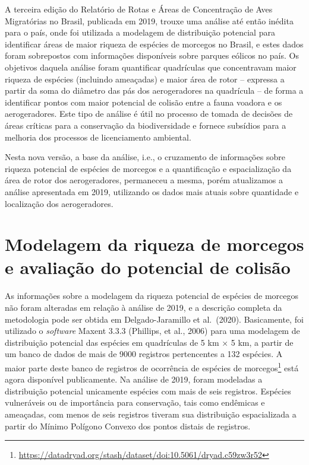 \documentclass[
  oneside]{scrbook}
\DeclareRobustCommand{\href}[2]{#2\footnote{\url{#1}}}
\begin{document}
A terceira edição do Relatório de Rotas e Áreas de Concentração de Aves Migratórias no Brasil, publicada em 2019, trouxe uma análise até então inédita para o país, onde foi utilizada a modelagem de distribuição potencial para identificar áreas de maior riqueza de espécies de morcegos no Brasil, e estes dados foram sobrepostos com informações disponíveis sobre parques eólicos no país. Os objetivos daquela análise foram quantificar quadrículas que concentravam maior riqueza de espécies (incluindo ameaçadas) e maior área de rotor -- expressa a partir da soma do diâmetro das pás dos aerogeradores na quadrícula -- de forma a identificar pontos com maior potencial de colisão entre a fauna voadora e os aerogeradores. Este tipo de análise é útil no processo de tomada de decisões de áreas críticas para a conservação da biodiversidade e fornece subsídios para a melhoria dos processos de licenciamento ambiental.

Nesta nova versão, a base da análise, i.e., o cruzamento de informações sobre riqueza potencial de espécies de morcegos e a quantificação e espacialização da área de rotor dos aerogeradores, permaneceu a mesma, porém atualizamos a análise apresentada em 2019, utilizando os dados mais atuais sobre quantidade e localização dos aerogeradores.

\hypertarget{modelagem-da-riqueza-de-morcegos-e-avaliauxe7uxe3o-do-potencial-de-colisuxe3o}{%
\section{Modelagem da riqueza de morcegos e avaliação do potencial de colisão}\label{modelagem-da-riqueza-de-morcegos-e-avaliauxe7uxe3o-do-potencial-de-colisuxe3o}}

As informações sobre a modelagem da riqueza potencial de espécies de morcegos não foram alteradas em relação à análise de 2019, e a descrição completa da metodologia pode ser obtida em Delgado-Jaramillo et al.~(2020). Basicamente, foi utilizado o \emph{software} Maxent 3.3.3 (Phillips, et al., 2006) para uma modelagem de distribuição potencial das espécies em quadrículas de 5 km × 5 km, a partir de um banco de dados de mais de 9000 registros pertencentes a 132 espécies. A maior parte deste \href{https://datadryad.org/stash/dataset/doi:10.5061/dryad.c59zw3r52}{banco de registros de ocorrência de espécies de morcegos} está agora disponível publicamente. Na análise de 2019, foram modeladas a distribuição potencial unicamente espécies com mais de seis registros. Espécies vulneráveis ou de importância para conservação, tais como endêmicas e ameaçadas, com menos de seis registros tiveram sua distribuição espacializada a partir do Mínimo Polígono Convexo dos pontos distais de registros.
\end{document}
